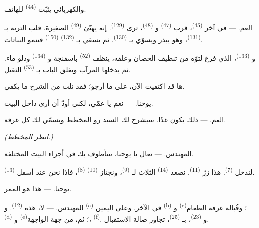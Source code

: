 والكهربائي يثبّت  \textsuperscript{(44)} للهاتف.

\VUsaut{3.0mm}

\textsc{العم}. --- في آخر  \textsuperscript{(45)}، قرب
 \textsuperscript{(47)} و
\textsuperscript{(48)}، ترى  \textsuperscript{(129)}. إنه يهيّئ
 \textsuperscript{(49)} الصغيرة. قلب التربة بـ
\textsuperscript{(131)}، وهو يبذر ويسوّي بـ
\textsuperscript{(130)}. ثم يسقي بـ \textsuperscript{(132)}
 \textsuperscript{(150)} فتنمو النباتات.

و \textsuperscript{(133)}، الذي فرغ لتوّه من تنظيف الحصان وعلفه،
ينظف  \textsuperscript{(52)} بإسفنجة و
\textsuperscript{(134)} ودلو ماء. ثم يدخلها المرآب ويغلق الباب
بـ \textsuperscript{(53)} الثقيل.

ها قد اكتفيت الآن، على ما أرجو؛ فقد نلت من الشرح ما يكفي.

\textsc{يوحنا}. --- نعم يا عمّي، لكني أودّ أن أرى داخل البيت.

\textsc{العم}. --- ذلك يكون غدًا. سيشرح لك السيد رو المخطط ويسمّي لك كل
غرفة.

\VUsaut{3.0mm}
\VUsaut{2.4mm}

{\centering\textit{(انظر المخطط.)}\par}
\VUsaut{2.4mm}

\textsc{المهندس}. --- تعال يا يوحنا، سأطوف بك في أجزاء البيت المختلفة.

لندخل  \textsuperscript{(7)}. هذا زرّ 
\textsuperscript{(11)}. نصعد  \textsuperscript{(14)} الثلاث
لـ \textsuperscript{(9)}، ونجتاز 
\textsuperscript{(10)}  \textsuperscript{(8)}، فإذا نحن عند
أسفل  \textsuperscript{(13)}.

\textsc{يوحنا}. --- هذا هو الممر.

\textsc{المهندس}. --- لا، هذه  \textsuperscript{(12)}.
و \textsuperscript{(a)} في الآخر. وعلى اليمين  \textsuperscript{(b)} و \textsuperscript{(c)}؛ وقُبالة
غرفة الطعام  \textsuperscript{(d)} و
\textsuperscript{(e)}؛ ثم، من جهة الواجهة،  \textsuperscript{(f)}.
و \textsuperscript{(23)}، بـ
\textsuperscript{(25)}، تجاور صالة الاستقبال.

